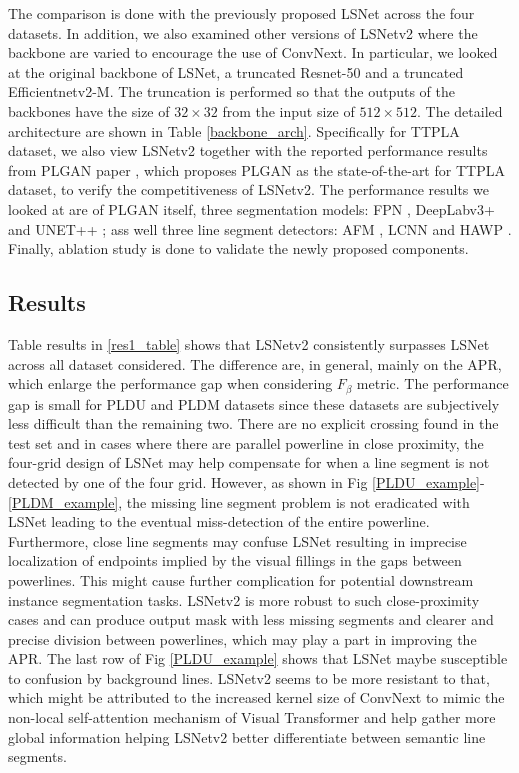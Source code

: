 \documentclass[journal]{IEEEtran}
\begin{document}
The comparison is done with the previously proposed LSNet across the four datasets. In addition, we also examined other versions of LSNetv2 where the backbone are varied to encourage the use of ConvNext. In particular, we looked at the original backbone of LSNet, a truncated Resnet-50 \cite{resnet} and a truncated Efficientnetv2-M\cite{efficientnetv2}. The truncation is performed so that the outputs of the backbones have the size of $32 \times 32$ from the input size of $512 \times 512$. The detailed architecture are shown in Table \ref{backbone_arch}. Specifically for TTPLA dataset, we also view LSNetv2 together with the reported performance results from PLGAN paper \cite{related_work_rabab_abdelfattah_2022}, which proposes PLGAN as the state-of-the-art for TTPLA dataset, to verify the competitiveness of LSNetv2. The performance results we looked at are of PLGAN itself, three segmentation models: FPN \cite{fpn}, DeepLabv3+ \cite{deeplapv3} and UNET++ \cite{unetplusplus}; ass well three line segment detectors: AFM \cite{afm}, LCNN \cite{lcnn} and HAWP \cite{hawp}. Finally, ablation study is done to validate the newly proposed components. 

\subsection{Results}

Table results in \ref{res1_table} shows that LSNetv2 consistently surpasses LSNet across all dataset considered. The difference are, in general, mainly on the APR, which enlarge the performance gap when considering $F_{\beta}$ metric. The performance gap is small for PLDU and PLDM datasets since these datasets are subjectively less difficult than the remaining two.  There are no explicit crossing found in the test set and in cases where there are parallel powerline in close proximity, the four-grid design of LSNet may help compensate for when a line segment is not detected by one of the four grid. However, as shown in Fig \ref{PLDU_example}-\ref{PLDM_example}, the missing line segment problem is not eradicated with LSNet leading to the eventual miss-detection of the entire powerline. Furthermore, close line segments may confuse LSNet resulting in imprecise localization of endpoints implied by the visual fillings in the gaps between powerlines. This might cause further complication for potential downstream instance segmentation tasks. LSNetv2 is more robust to such close-proximity cases and can produce output mask with less missing segments and clearer and precise division between powerlines, which may play a part in improving the APR. The last row of Fig \ref{PLDU_example} shows that LSNet maybe susceptible to confusion by background lines. LSNetv2 seems to be more resistant to that, which might be attributed to the increased kernel size of ConvNext to mimic the non-local self-attention mechanism of Visual Transformer \cite{visual_transformer} and help gather more global information helping LSNetv2 better differentiate between semantic line segments.
\end{document}
